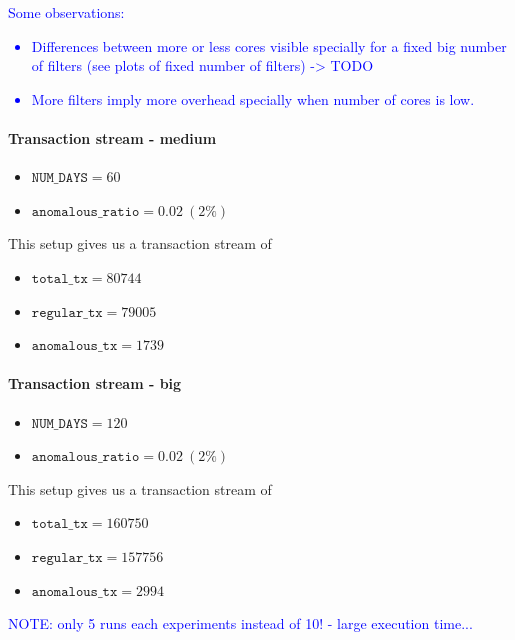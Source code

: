 \documentclass[12pt,a4paper]{article}
\begin{document}
\textcolor{blue}{
Some observations:
\begin{itemize}
    \item Differences between  more or less cores visible specially for a fixed big number of filters (see plots of fixed number of filters) -> TODO
    \item More filters imply more overhead specially when number of cores is low.
\end{itemize}
}

\paragraph{Transaction stream - medium\\}

\begin{itemize}
  \item $\texttt{NUM\_DAYS} = 60$
  \item $\texttt{anomalous\_ratio} = 0.02\ (2\%)$ 
\end{itemize}

This setup gives us a transaction stream of 
\begin{itemize}
  \item $\texttt{total\_tx} = 80744$
  \item $\texttt{regular\_tx} = 79005$
  \item $\texttt{anomalous\_tx} = 1739$
\end{itemize}

\paragraph{Transaction stream - big\\}

\begin{itemize}
  \item $\texttt{NUM\_DAYS} = 120$
  \item $\texttt{anomalous\_ratio} = 0.02\ (2\%)$ 
\end{itemize}

This setup gives us a transaction stream of 
\begin{itemize}
  \item $\texttt{total\_tx} = 160750$
  \item $\texttt{regular\_tx} = 157756$
  \item $\texttt{anomalous\_tx} = 2994$
\end{itemize}

\textcolor{blue}{NOTE: only 5 runs each experiments instead of 10! - large execution time...}
\end{document}
